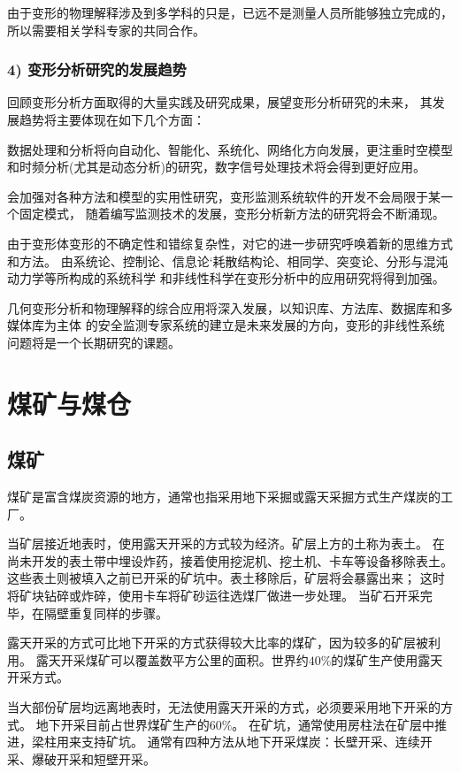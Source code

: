 由于变形的物理解释涉及到多学科的只是，已远不是测量人员所能够独立完成的，
所以需要相关学科专家的共同合作。

\subsubsection*{4) 变形分析研究的发展趋势}
回顾变形分析方面取得的大量实践及研究成果，展望变形分析研究的未来，
其发展趋势将主要体现在如下几个方面：
\begin{asparaitem}[$\bullet$]
\item 数据处理和分析将向自动化、智能化、系统化、网络化方向发展，更注重时空模型
和时频分析(尤其是动态分析)的研究，数字信号处理技术将会得到更好应用。
\item 会加强对各种方法和模型的实用性研究，变形监测系统软件的开发不会局限于某一个固定模式，
随着编写监测技术的发展，变形分析新方法的研究将会不断涌现。
\item 由于变形体变形的不确定性和错综复杂性，对它的进一步研究呼唤着新的思维方式和方法。
由系统论、控制论、信息论‘耗散结构论、相同学、突变论、分形与混沌动力学等所构成的系统科学
和非线性科学在变形分析中的应用研究将得到加强。
\item 几何变形分析和物理解释的综合应用将深入发展，以知识库、方法库、数据库和多媒体库为主体
的安全监测专家系统的建立是未来发展的方向，变形的非线性系统问题将是一个长期研究的课题。
\end{asparaitem}


\section{煤矿与煤仓}
\subsection{煤矿}
煤矿是富含煤炭资源的地方，通常也指采用地下采掘或露天采掘方式生产煤炭的工厂。

当矿层接近地表时，使用露天开采的方式较为经济。矿层上方的土称为表土。
在尚未开发的表土带中埋设炸药，接着使用挖泥机、挖土机、卡车等设备移除表土。
这些表土则被填入之前已开采的矿坑中。表土移除后，矿层将会暴露出来；
这时将矿块钻碎或炸碎，使用卡车将矿砂运往选煤厂做进一步处理。
当矿石开采完毕，在隔壁重复同样的步骤。

露天开采的方式可比地下开采的方式获得较大比率的煤矿，因为较多的矿层被利用。
露天开采煤矿可以覆盖数平方公里的面积。世界约$40\%$的煤矿生产使用露天开采方式。

当大部份矿层均远离地表时，无法使用露天开采的方式，必须要采用地下开采的方式。
地下开采目前占世界煤矿生产的$60\%$。
在矿坑，通常使用房柱法在矿层中推进，梁柱用来支持矿坑。
通常有四种方法从地下开采煤炭：长壁开采、连续开采、爆破开采和短壁开采。

